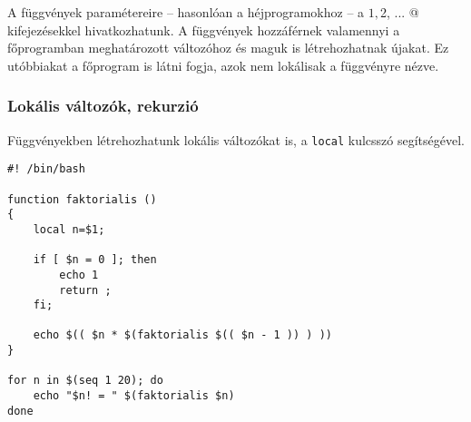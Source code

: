 A függvények paramétereire -- hasonlóan a héjprogramokhoz -- a \verb@$1, $2, ... @ kifejezésekkel hivat\-koz\-ha\-tunk.
A függvények hozzáférnek valamennyi a főprogramban meghatározott változóhoz és maguk is lét\-re\-hoz\-hat\-nak újakat. 
Ez utóbbiakat a főprogram is látni fogja, azok nem lokálisak a függvényre nézve. 


\subsubsection*{Lokális változók, rekurzió}
Függvényekben létrehozhatunk lokális változókat is, a \texttt{local} kulcsszó segítségével.



\begin{lstlisting}
#! /bin/bash

function faktorialis ()
{
    local n=$1;

    if [ $n = 0 ]; then
        echo 1
        return ;
    fi;

    echo $(( $n * $(faktorialis $(( $n - 1 )) ) ))
}

for n in $(seq 1 20); do
    echo "$n! = " $(faktorialis $n)
done
\end{lstlisting}



